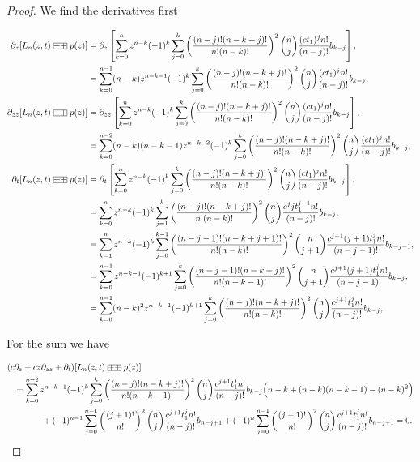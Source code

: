 \begin{proof}
    We find the derivatives first

    \begin{align*}
        \partial_z[L_n(z,t) \aac p(z)] &= \partial_z \left[ \sum_{k=0}^n z^{n-k}(-1)^k \sum_{j=0}^k \left(\frac{(n-j)!(n-k+j)!}{n!(n-k)!}\right)^2 \binom{n}{j}\frac{(ct_1)^jn!}{(n-j)!}b_{k-j}\right],\\ 
        &= \sum_{k=0}^{n-1} (n-k)z^{n-k-1}(-1)^k \sum_{j=0}^k \left(\frac{(n-j)!(n-k+j)!}{n!(n-k)!}\right)^2 \binom{n}{j}\frac{(ct_1)^jn!}{(n-j)!}b_{k-j},\\
        \partial_{zz}[L_n(z,t) \aac p(z)] &= \partial_{zz} \left[ \sum_{k=0}^n z^{n-k}(-1)^k \sum_{j=0}^k \left(\frac{(n-j)!(n-k+j)!}{n!(n-k)!}\right)^2 \binom{n}{j}\frac{(ct_1)^jn!}{(n-j)!}b_{k-j}\right],\\ 
        &= \sum_{k=0}^{n-2} (n-k)(n-k-1)z^{n-k-2}(-1)^k \sum_{j=0}^k \left(\frac{(n-j)!(n-k+j)!}{n!(n-k)!}\right)^2 \binom{n}{j}\frac{(ct_1)^jn!}{(n-j)!}b_{k-j},\\
        \partial_t[L_n(z,t) \aac p(z)] &= \partial_t \left[ \sum_{k=0}^n z^{n-k}(-1)^k \sum_{j=0}^k \left(\frac{(n-j)!(n-k+j)!}{n!(n-k)!}\right)^2 \binom{n}{j}\frac{(ct_1)^jn!}{(n-j)!}b_{k-j}\right],\\
        &= \sum_{k=0}^n z^{n-k}(-1)^k \sum_{j=1}^k \left(\frac{(n-j)!(n-k+j)!}{n!(n-k)!}\right)^2 \binom{n}{j}\frac{c^j jt_1^{j-1}n!}{(n-j)!}b_{k-j},\\ 
        &= \sum_{k=1}^n z^{n-k}(-1)^k \sum_{j=0}^{k-1} \left(\frac{(n-j-1)!(n-k+j+1)!}{n!(n-k)!}\right)^2 \binom{n}{j+1}\frac{c^{j+1} (j+1)t_1^{j}n!}{(n-j-1)!}b_{k-j-1},\\ 
        &= \sum_{k=0}^{n-1} z^{n-k-1}(-1)^{k+1} \sum_{j=0}^{k} \left(\frac{(n-j-1)!(n-k+j)!}{n!(n-k-1)!}\right)^2 \binom{n}{j+1}\frac{c^{j+1} (j+1)t_1^{j}n!}{(n-j-1)!}b_{k-j},\\ 
        &= \sum_{k=0}^{n-1} (n-k)^2 z^{n-k-1}(-1)^{k+1} \sum_{j=0}^{k} \left(\frac{(n-j)!(n-k+j)!}{n!(n-k)!}\right)^2 \binom{n}{j}\frac{c^{j+1}t_1^{j}n!}{(n-j)!}b_{k-j},\\ 
    \end{align*}

    For the sum we have

    \begin{align*}
        (c&\partial_z + cz\partial_{zz} + \partial_t )[L_n(z,t)\aac p(z)] \\  &= \sum_{k=0}^{n-2} z^{n-k-1}(-1)^k \sum_{j=0}^{k} \left(\frac{(n-j)!(n-k+j)!}{n!(n-k-1)!}\right)^2 \binom{n}{j}\frac{c^{j+1}t_1^{j}n!}{(n-j)!}b_{k-j}\Bigl(n-k + (n-k)(n-k-1) - (n-k)^2\Bigr)\\ 
        &\phantom{espacio}+ (-1)^{n-1}\sum_{j=0}^{n-1} \left( \frac{(j+1)!}{n!} \right)^2\binom{n}{j}\frac{c^{j+1}t_1^{j}n!}{(n-j)!}b_{n-j+1} + (-1)^{n}\sum_{j=0}^{n-1} \left( \frac{(j+1)!}{n!} \right)^2\binom{n}{j}\frac{c^{j+1}t_1^{j}n!}{(n-j)!}b_{n-j+1} = 0.
    \end{align*}
\end{proof}

